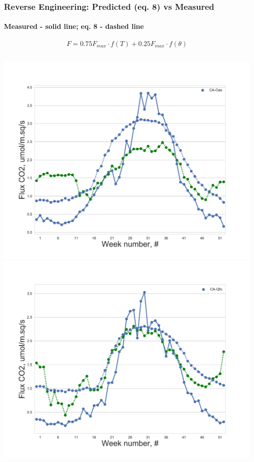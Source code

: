 \documentclass{beamer}
\begin{document}
\begin{frame}
\frametitle{Reverse Engineering: Predicted (eq. 8) vs Measured}
\framesubtitle{Measured - solid line; eq. 8 - dashed line}

\begin{equation}
\label{eq:TO}
    F = 0.75F_{max}\cdot f(T) + 0.25F_{max}\cdot f(\theta)
\end{equation}

\begin{columns}[t]
\centering
\includegraphics[width=\textwidth]{Reverse_engin/10.png}\\
\includegraphics[width=\textwidth]{Reverse_engin/14.png}

\end{columns}
\end{frame}
\end{document}
